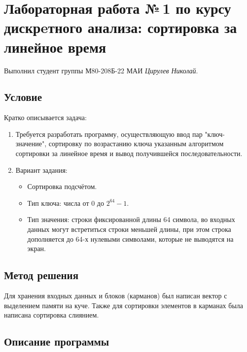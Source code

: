 \documentclass[12pt]{article}
\begin{document}
\section*{Лабораторная работа №\,1 по курсу дискрeтного анализа: сортировка за линейное время}

Выполнил студент группы М80-208Б-22 МАИ \textit{Цирулев Николай}.

\subsection*{Условие}

Кратко описывается задача:
\begin{enumerate}
\item
    Требуется разработать программу, осуществляющую ввод пар "ключ-значение", сортировку по возрастанию ключа указанным алгоритмом сортировки за линейное время и вывод получившейся последовательности.
\item
    Вариант задания:
        \begin{itemize}
            \item Сортировка подсчётом.
            \item Тип ключа: числа от 0 до $2^{64}-1$.
            \item Тип значения: строки фиксированной длины 64 символа, во входных данных могут встретиться строки меньшей длины, при этом строка дополняется до 64-х нулевыми символами, которые не выводятся на экран.
        \end{itemize}
\end{enumerate}

\subsection*{Метод решения}

Для хранения входных данных и блоков (карманов) был написан вектор с выделением памяти на куче. Также для сортировки элементов в карманах была написана сортировка слиянием.

\subsection*{Описание программы}
\end{document}
